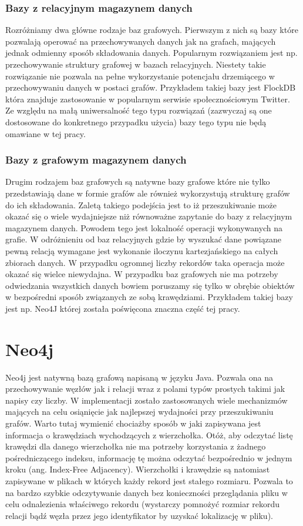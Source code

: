 \documentclass[brudnopis]{xmgr}
\begin{document}
\subsection{Bazy z relacyjnym magazynem danych}

Rozróżniamy dwa główne rodzaje baz grafowych. Pierwszym z nich są bazy które pozwalają operować na przechowywanych danych jak na grafach, mających jednak odmienny sposób składowania danych. Popularnym rozwiązaniem jest np. przechowywanie struktury grafowej w bazach relacyjnych. Niestety takie rozwiązanie nie pozwala na pełne wykorzystanie potencjału drzemiącego w przechowywaniu danych w postaci grafów. Przykładem takiej bazy jest FlockDB która znajduje zastosowanie w popularnym serwisie społecznościowym Twitter. Ze względu na małą uniwersalność tego typu rozwiązań (zazwyczaj są one dostosowane do konkretnego przypadku użycia) bazy tego typu nie będą omawiane w tej pracy.

\subsection{Bazy z grafowym magazynem danych}
Drugim rodzajem baz grafowych są natywne bazy grafowe które nie tylko przedstawiają dane w formie grafów ale również wykorzystują strukturę grafów do ich składowania. Zaletą takiego podejścia jest to iż przeszukiwanie może okazać się o wiele wydajniejsze niż równoważne zapytanie do bazy z relacyjnym magazynem danych. Powodem tego jest lokalność operacji wykonywanych na grafie. W odróżnieniu od baz relacyjnych gdzie by wyszukać dane powiązane pewną relacją wymagane jest wykonanie iloczynu kartezjańskiego na całych zbiorach danych. W przypadku ogromnej liczby rekordów taka operacja może okazać się wielce niewydajna. W przypadku baz grafowych nie ma potrzeby odwiedzania wszystkich danych bowiem poruszamy się tylko w obrębie obiektów w bezpośredni sposób związanych ze sobą krawędziami. Przykładem takiej bazy jest np. Neo4J której została poświęcona znaczna część tej pracy.

\chapter{Neo4j}

Neo4j jest natywną bazą grafową napisaną w języku Java. Pozwala ona na przechowywanie węzłów jak i relacji wraz z polami typów prostych takimi jak napisy czy liczby. W implementacji zostało zastosowanych wiele mechanizmów mających na celu osiąnięcie jak najlepszej wydajności przy przeszukiwaniu grafów. Warto tutaj wymienić chociażby sposób w jaki zapisywana jest informacja o krawędziach wychodzących z wierzchołka. Otóż, aby odczytać listę krawędzi dla danego wierzchołka nie ma potrzeby korzystania z żadnego pośredniczącego indeksu, informację tę można odczytać bezpośrednio w jednym kroku (ang. Index-Free Adjacency). Wierzchołki i krawędzie są natomiast zapisywane w plikach w których każdy rekord jest stałego rozmiaru. Pozwala to na bardzo szybkie odczytywanie danych bez konieczności przeglądania pliku w celu odnalezienia właściwego rekordu (wystarczy pomnożyć rozmiar rekordu relacji bądź węzła przez jego identyfikator by uzyskać lokalizację w pliku).
\end{document}
